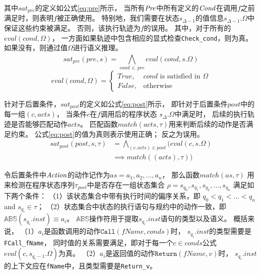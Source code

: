 其中$sat_{pre}$的定义如公式\ref{eq:pre}所示，
当所有$\mathit{Pre}$中所有定义的$\mathit{Cond}$在调用$f$之前满足时，则表明$f$被正确使用。
特别地，我们需要在状态$s_{\Delta-1}$的值信息$s_{\Delta-1}.\Omega$中保证这些约束被满足。
否则，该执行轨迹为$f$的误用。
其中，对于所有的$eval(cond, \Omega)$，
一方面如果轨迹中包含相应的显式检查\texttt{Check\_cond}，则为真。
如果没有，则通过值$\Omega$进行语义推理。
\begin{equation}
\label{eq:pre}
sat_{pre}(\mathit{pre}, s) = \bigwedge_{cond\,\in\,\mathit{pre}}^{} eval(cond, s.\Omega)
\end{equation}
\begin{equation}
\label{eq:eval}
eval(\mathit{cond}, \Omega) = 
\begin{cases}
True, & \text{$\mathit{cond}$ is satisfied in $\Omega$}\\
False,              & \text{otherwise}
\end{cases}
\end{equation}


针对于后置条件，$sat_{post}$的定义如公式\ref{eq:post}所示，
即针对于后置条件$\mathit{post}$中的每一组$(c,\mathit{acts})$，
当条件$c$在$f$调用后的程序状态 $s_{\Delta}.\Omega$中满足时，
后续的执行轨迹是否能够匹配动作$\mathit{acts}$。
匹配函数$\mathit{match}(\mathit{acts}, \tau)$用来判断后续的动作是否满足约束。
公式\ref{eq:post}的值为真则表示使用正确；
反之为误用。
\begin{align}
\label{eq:post}
sat_{post}(\mathit{post},s,\tau) &=  \bigwedge_{(c,acts) \in \mathit{post}}^{} 
\Big( eval(\mathit{c},s.\Omega) \nonumber \\
& \implies
match((acts), \tau) \Big)
\end{align}

令后置条件中$\mathit{Action}$的动作记作为$\mathit{as} = a_1, a_2, \dots,a_n$，
那么函数$\mathit{match}(\mathit{as}, \tau)$
用来检测在程序状态序列$\tau_{post}$中是否存在一组状态集合
$\rho = s_{q_0}, s_{q_1}, s_{q_2}, \dots,s_{q_n}$
满足如下两个条件：
（1）该状态集合中带有执行时间的偏序关系，即
$q_0 < q_1 < \ldots < q_n$ and $s_{q_i}\in\tau$；
（2）状态集合中状态的执行语句与规约中的动作一致，即
$\mathbb{ABS}(s_{q_i}.inst) \equiv a_i$。
$\mathbb{ABS}$操作符用于提取$s_{q_i}.inst$语句的类型以及语义。
概括来说，
（1）$a_i$是函数调用的动作$\texttt{Call}(\mathit{fName},\mathit{conds})$时，
$s_{q_i}.inst$的类型需要是\texttt{FCall\_fName}，
同时值的关系需要满足，即对于每一个$c \in conds$公式$eval(c, s_{q_i-1}.\Omega)$为真。
（2）$a_i$是返回值的动作$\texttt{Return}(\mathit{fName},\mathit{v})$时，
$s_{q_i}.inst$的上下文应在\texttt{fName}中，且类型需要是\texttt{Return\_v}。



